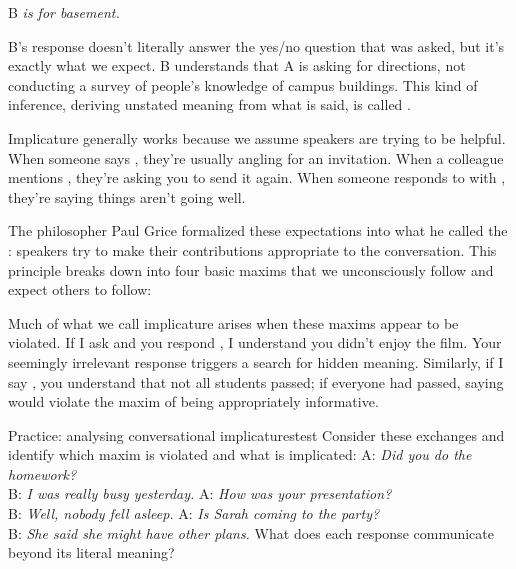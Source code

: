 \begin{dialogue}
\item[A] 
\item[B] B\textit{ is for basement.}
\end{dialogue}

B's response doesn't literally answer the yes/no question that was asked, but it's exactly what we expect. B understands that A is asking for directions, not conducting a survey of people's knowledge of campus buildings. This kind of inference, deriving unstated meaning from what is said, is called .

Implicature generally works because we assume speakers are trying to be helpful. When someone says , they're usually angling for an invitation. When a colleague mentions , they're asking you to send it again. When someone responds to  with , they're saying things aren't going well.

The philosopher Paul Grice formalized these expectations into what he called the : speakers try to make their contributions appropriate to the conversation. This principle breaks down into four basic maxims that we unconsciously follow and expect others to follow:

\ea
   \z
\z
Much of what we call implicature arises when these maxims appear to be violated. If I ask  and you respond , I understand you didn't enjoy the film. Your seemingly irrelevant response triggers a search for hidden meaning. Similarly, if I say , you understand that not all students passed; if everyone had passed, saying  would violate the maxim of being appropriately informative.

\begin{tblsframedsymbol}{Practice: analysing conversational implicatures}{test}
Consider these exchanges and identify which maxim is violated and what is implicated:
\ea
    \ea A: \emph{Did you do the homework?}\\
    B: \emph{I was really busy yesterday.}
    \ex A: \emph{How was your presentation?}\\
    B: \emph{Well, nobody fell asleep.}
    \ex A: \emph{Is Sarah coming to the party?}\\
    B: \emph{She said she might have other plans.}
    \z
\z
What does each response communicate beyond its literal meaning?
\end{tblsframedsymbol}

